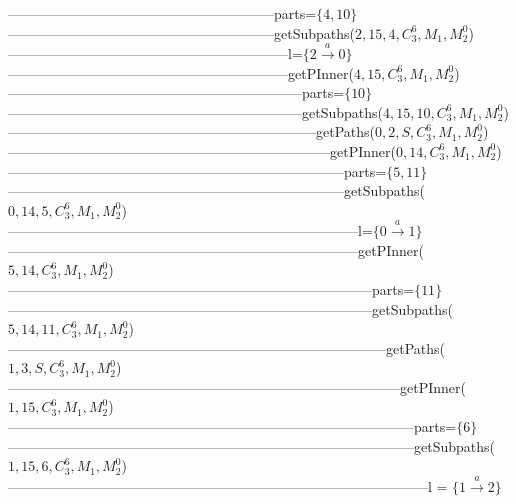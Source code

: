 {---------------------------------------------------------parts=$\{4,10\}$\\
---------------------------------------------------------getSubpaths($2,15,4,C_3^6,M_1,M_2^0$)\\
------------------------------------------------------------l=$\{2 \xrightarrow{a} 0\}$\\
------------------------------------------------------------getPInner($4,15,C_3^6,M_1,M_2^0$)\\
---------------------------------------------------------------parts=$\{10\}$\\
---------------------------------------------------------------getSubpaths($4,15,10,C_3^6,M_1,M_2^0$)\\
------------------------------------------------------------------getPaths($0,2,S,C_3^6,M_1,M_2^0$)\\
---------------------------------------------------------------------getPInner($0,14,C_3^6,M_1,M_2^0$)\\
------------------------------------------------------------------------parts=$\{5,11\}$\\
------------------------------------------------------------------------getSubpaths($0,14,5,C_3^6,M_1,M_2^0$)\\
---------------------------------------------------------------------------l=$\{0 \xrightarrow{a} 1\}$\\
---------------------------------------------------------------------------getPInner($5,14,C_3^6,M_1,M_2^0$)\\
------------------------------------------------------------------------------parts=$\{11\}$\\
------------------------------------------------------------------------------getSubpaths($5,14,11,C_3^6,M_1,M_2^0$)\\
---------------------------------------------------------------------------------getPaths($1,3,S,C_3^6,M_1,M_2^0$)\\
------------------------------------------------------------------------------------getPInner($1,15,C_3^6,M_1,M_2^0$)\\
---------------------------------------------------------------------------------------parts=$\{6\}$\\
---------------------------------------------------------------------------------------getSubpaths($1,15,6,C_3^6,M_1,M_2^0$)\\
------------------------------------------------------------------------------------------l = $\{1 \xrightarrow{a} 2\}$\\
}
